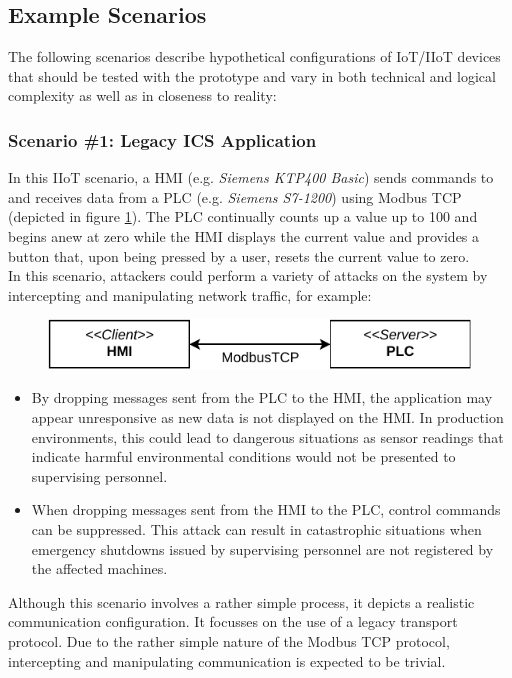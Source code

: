 \subsection{Example Scenarios}
\label{sec:example-scenarios}
The following scenarios describe hypothetical configurations of \ac{IoT}/\ac{IIoT} devices that should be tested with the prototype and vary in both technical and logical complexity as well as in closeness to reality:

\subsubsection{Scenario \#1: Legacy \ac{ICS} Application}
\label{par:scenario-1}
In this \ac{IIoT} scenario, a \ac{HMI} (e.g. \emph{Siemens KTP400 Basic}) sends commands to and receives data from a \ac{PLC} (e.g. \emph{Siemens S7-1200}) using Modbus \ac{TCP} (depicted in figure \ref{fig:arch-ics}). The \ac{PLC} continually counts up a value up to 100 and begins anew at zero while the \ac{HMI} displays the current value and provides a button that, upon being pressed by a user, resets the current value to zero. \\
In this scenario, attackers could perform a variety of attacks on the system by intercepting and manipulating network traffic, for example:
\begin{figure}[h]
    \centering
    \includegraphics{img/ch04/Scenario_ICS.pdf}
    \label{fig:arch-ics}
\end{figure}
\begin{itemize}
    \item By dropping messages sent from the \ac{PLC} to the \ac{HMI}, the application may appear unresponsive as new data is not displayed on the \ac{HMI}. In production environments, this could lead to dangerous situations as sensor readings that indicate harmful environmental conditions would not be presented to supervising personnel.
    \item When dropping messages sent from the \ac{HMI} to the \ac{PLC}, control commands can be suppressed. This attack can result in catastrophic situations when emergency shutdowns issued by supervising personnel are not registered by the affected machines.
\end{itemize}
Although this scenario involves a rather simple process, it depicts a realistic communication configuration. It focusses on the use of a legacy transport protocol. Due to the rather simple nature of the Modbus \ac{TCP} protocol, intercepting and manipulating communication is expected to be trivial. %

